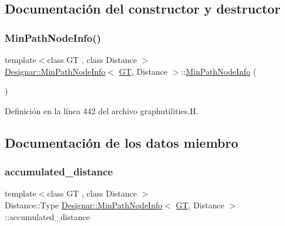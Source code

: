 \subsection{Documentación del constructor y destructor}
\mbox{\label{class_designar_1_1_min_path_node_info_a50c93fccfecfd75d3aa7637be108ef4d}} 
\subsubsection{\texorpdfstring{Min\+Path\+Node\+Info()}{MinPathNodeInfo()}}
{\footnotesize\ttfamily template$<$class GT , class Distance $>$ \\
\hyperlink{class_designar_1_1_min_path_node_info}{Designar\+::\+Min\+Path\+Node\+Info}$<$ \hyperlink{demo-buildgraph_8_c_a3001c40d2c31ca87ed96cd7d1334a55e}{GT}, Distance $>$\+::\hyperlink{class_designar_1_1_min_path_node_info}{Min\+Path\+Node\+Info} (\begin{DoxyParamCaption}{ }\end{DoxyParamCaption})\hspace{0.3cm}{\ttfamily [inline]}}



Definición en la línea 442 del archivo graphutilities.\+H.



\subsection{Documentación de los datos miembro}
\mbox{\label{class_designar_1_1_min_path_node_info_acd8b2664b0726bf26b0f66213e4f1e4b}} 
\subsubsection{\texorpdfstring{accumulated\+\_\+distance}{accumulated\_distance}}
{\footnotesize\ttfamily template$<$class GT , class Distance $>$ \\
Distance\+::\+Type \hyperlink{class_designar_1_1_min_path_node_info}{Designar\+::\+Min\+Path\+Node\+Info}$<$ \hyperlink{demo-buildgraph_8_c_a3001c40d2c31ca87ed96cd7d1334a55e}{GT}, Distance $>$\+::accumulated\+\_\+distance}



